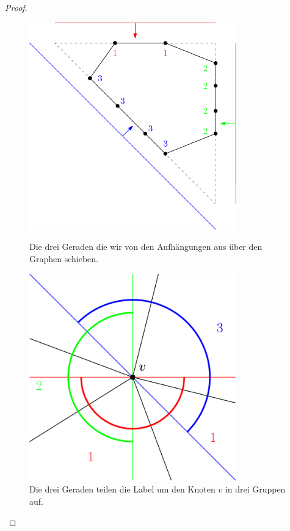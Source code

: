 \begin{proof}
\captionsetup{format=plain,labelsep=endash,justification=centerlast,width=.45\textwidth}
\begin{figure}
  \centering
  \begin{minipage}{0.45\textwidth}
  \centering
    \includegraphics[width=0.8\textwidth]{sweeplines1.png}
    \caption{Die drei Geraden die wir von den Aufhängungen aus über den Graphen schieben.}
    \label{sweeplines1}
  \end{minipage}
  \hfill
  \begin{minipage}{0.45\textwidth}
  \centering
    \includegraphics[width=0.8\textwidth]{sweeplines2.png}
    \caption{Die drei Geraden teilen die Label um den Knoten $v$ in drei Gruppen auf. }
    \label{sweeplines2}
  \end{minipage}
\end{figure}
\captionsetup{format=plain,labelsep=endash,justification=centerlast,width=.85\textwidth}


\end{proof}
